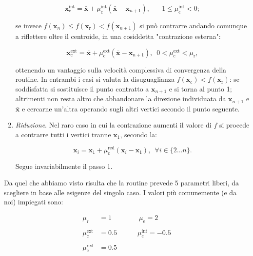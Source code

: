 \begin{enumerate}
	\begin{equation*}
	\mathbf{x}_\mathrm{c}^\mathrm{int} = \bar{\mathbf{x}} + \mu_\mathrm{c}^\mathrm{int} (\bar{\mathbf{x}} - \mathbf{x}_{n+1}),\enspace -1 \leq \mu_\mathrm{c}^\mathrm{int} < 0;
	\end{equation*}
	
	se invece $f(\mathbf{x}_n) \leq f(\mathbf{x}_\mathrm{r}) < f(\mathbf{x}_{n+1})$ si può contrarre andando comunque a riflettere oltre il centroide, in una cosiddetta "contrazione esterna":
	
	\begin{equation*}
	\mathbf{x}_\mathrm{c}^\mathrm{ext} = \bar{\mathbf{x}} + \mu_\mathrm{c}^\mathrm{ext} (\bar{\mathbf{x}} - \mathbf{x}_{n+1}),\enspace 0 < \mu_\mathrm{c}^\mathrm{ext} < \mu_\mathrm{r},
	\end{equation*}
	
	ottenendo un vantaggio sulla velocità complessiva di convergenza della routine. In entrambi i casi si valuta la disuguaglianza $f(\mathbf{x}_\mathrm{c}) < f(\mathbf{x}_\mathrm{r})$: se soddisfatta si sostituisce il punto contratto a $\mathbf{x}_{n+1}$ e si torna al punto 1; altrimenti non resta altro che abbandonare la direzione individuata da $\mathbf{x}_{n+1}$ e $\bar{\mathbf{x}}$ e cercarne un'altra operando sugli altri vertici secondo il punto seguente.
	
	\item \emph{Riduzione}. Nel raro caso in cui la contrazione aumenti il valore di $f$  si procede a contrarre tutti i vertici tranne $\mathbf{x}_1$, secondo la:
	
	\begin{equation*}
	\mathbf{x}_i = \mathbf{x}_1 + \mu_\mathrm{c}^\mathrm{red}(\mathbf{x}_i - \mathbf{x}_1),\enspace\forall i \in \{2\dots n\}.
	\end{equation*}
	
	Segue invariabilmente il passo 1.
	
\end{enumerate}

\vfill

\noindent Da quel che abbiamo visto risulta che la routine prevede 5 parametri liberi, da scegliere in base alle esigenze del singolo caso. I valori più comunemente (e da noi) impiegati sono:

\begin{align*}
\mu_\mathrm{r} &= 1\quad\quad\quad\quad\mu_\mathrm{e} = 2\\
\\
\mu_\mathrm{c}^\mathrm{ext} &= 0.5\quad\quad\quad\!\!\mu_\mathrm{c}^\mathrm{int} = - 0.5\\
\\
\mu_\mathrm{c}^\mathrm{red} &= 0.5\\
\end{align*}

